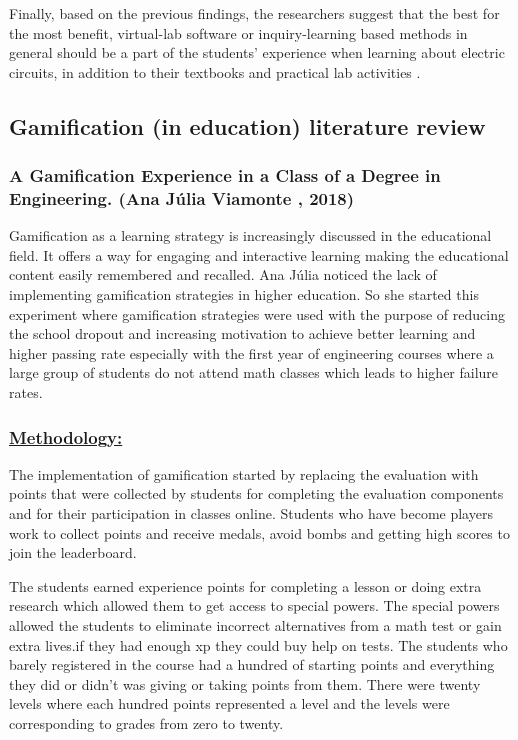 \documentclass[../main.tex]{subfiles}
\begin{document}
Finally, based on the previous findings, the researchers suggest that the best for the most benefit, virtual-lab software or inquiry-learning based methods in general should be a part of the students' experience when learning about electric circuits, in addition to their textbooks and practical lab activities \cite{25}.

\subsection{Gamification (in education) literature review}

\subsubsection{A Gamification Experience in a Class of a Degree in Engineering. (Ana Júlia Viamonte , 2018)}

Gamification as a learning strategy is increasingly discussed in the educational field. It offers a way for engaging and interactive learning making the educational content easily remembered and recalled. Ana Júlia noticed the lack of implementing gamification strategies in higher education. So she started this experiment where gamification strategies were used with the purpose of reducing the school dropout and increasing motivation to achieve better learning and higher passing rate especially with the first year of engineering courses  where a large group of students do not attend math classes which leads to higher failure rates.

\subsubsection*{\underline{Methodology:}}
The implementation of gamification started by replacing the evaluation with points that were collected by students for completing the evaluation components and for their participation in classes online. Students who have become players work to collect points and receive medals, avoid bombs and getting high scores to join the leaderboard.

The students earned experience points for completing a lesson or doing extra research which allowed them to get access to special powers. The special powers allowed the students to eliminate incorrect alternatives from a math test or  gain extra lives.if they had enough \acrshort{xp} they could buy help on tests. The students who barely registered in the course had a hundred of starting points and everything they did or didn't  was giving or taking points from them. There were twenty levels where each hundred points represented a level and the levels were corresponding to grades from zero to twenty.
\end{document}
